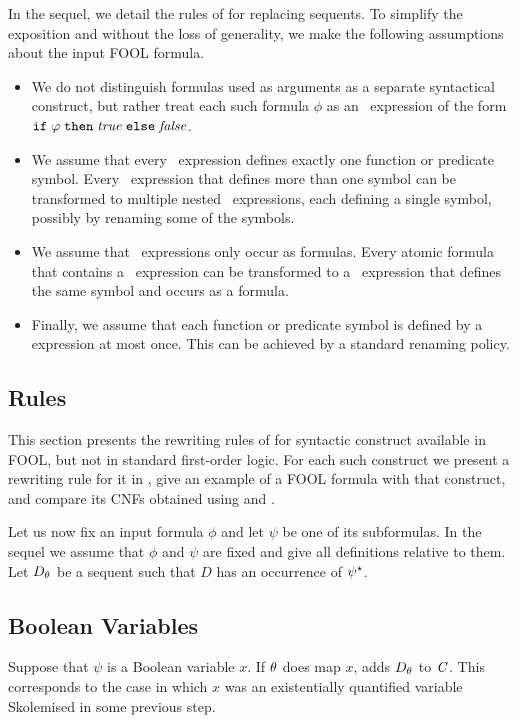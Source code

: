 In the sequel, we detail the rules of \nfcnf{} for replacing sequents. To simplify the exposition and without the loss of generality, we make the following assumptions about the input FOOL formula.
\begin{itemize}
\item
We do not distinguish formulas used as arguments as a separate syntactical construct, but rather treat each such formula $\phi$ as an \ITE\ expression of the form $\mathtt{if}\;{\varphi}\;\allowbreak\mathtt{then}\;{\mathit{true}}\;\allowbreak\mathtt{else}\;{\mathit{false}}$. 
\item
We assume that every \LETIN\ expression defines exactly one function or predicate symbol.
%
Every \LETIN\ expression that defines more than one symbol can be transformed to multiple nested \LETIN\ expressions,
each defining a single symbol, possibly by renaming some of the symbols. 
\item
We assume that \LETIN\ expressions only occur as formulas. 
%
Every atomic formula that contains a \LETIN\ expression can be transformed to a \LETIN\ expression that defines the same symbol and occurs as a formula. 
\item
Finally, we assume that each function or predicate symbol is defined by a \LETIN{} expression at most once. 
%
This can be achieved by a standard renaming policy.
\end{itemize}

\subsection{\nfcnf{} Rules}
This section presents the rewriting rules of \nfcnf{} for syntactic construct available in FOOL, but not in standard first-order logic. For each such construct we present a rewriting rule for it in \nfcnf{}, give an example of a FOOL formula with that construct, and compare its CNFs obtained using \nfcnf{} and \oldcnf{}.

Let us now fix an input formula $\phi$ and let $\psi$ be one of its subformulas. 
In the sequel we assume that $\phi$ and $\psi$ are fixed and give all definitions relative to them. 
Let ${D}_{\theta}$ be a sequent such that $D$ has an occurrence of ${\psi}^{\star}$. 

\subsection*{Boolean Variables}
Suppose that $\psi$ is a Boolean variable $x$. 
If $\theta$ does map $x$, \nfcnf{} adds ${D}_{\theta}$ to $\mathit{C}$.
This corresponds to the case in which $x$ was an existentially quantified variable Skolemised in some previous step.
        
